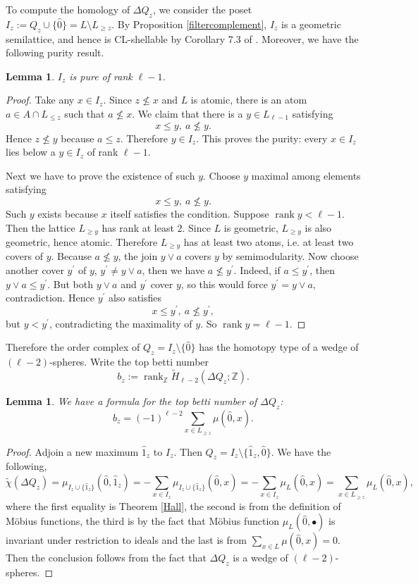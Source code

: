 \documentclass{amsart}
\numberwithin{equation}{section}
\theoremstyle{plain}
\newtheorem{lem}[thm]{Lemma}
\theoremstyle{remark}
\theoremstyle{definition}
\numberwithin{equation}{section}
\newcommand{\Z}{\mathbb{Z}}
\DeclareMathOperator{\rank}{rank}
\begin{document}
To compute the homology of $\Delta Q_z$, we consider the poset $I_z:=Q_z\cup\{\hat{0}\}=L\setminus L_{\geq z}$. By Proposition \ref{filtercomplement}, $I_z$ is a geometric semilattice, and hence is CL-shellable by Corollary 7.3 of \cite{Wachs1986}. Moreover, we have the following purity result.
\begin{lem}
    $I_z$ is pure of rank $\ell-1$.
\end{lem}
\begin{proof}
    Take any $x\in I_z$. Since $z\not\leq x$ and $L$ is atomic, there is an atom $a\in A\cap L_{\leq z}$ such that $a\not\leq x$. We claim that there is a $y\in L_{\ell-1}$ satisfying
    \[
    x\leq y,~a\not\leq y.
    \]
    Hence $z\not\leq y$ because $a\leq z$. Therefore $y\in I_z$. This proves the purity: every $x\in I_z$ lies below a $y\in I_z$ of rank $\ell-1$.

    Next we have to prove the existence of such $y$. Choose $y$ maximal among elements satisfying
    \[
    x\leq y, ~a\not\leq y.
    \]
    Such $y$ exists because $x$ itself satisfies the condition. Suppose $\rank y<\ell-1$. Then the lattice $L_{\geq y}$ has rank at least $2$. Since $L$ is geometric, $L_{\geq y}$ is also geometric, hence atomic. Therefore $L_{\geq y}$ has at least two atoms, i.e. at least two covers of $y$. Because $a\not\leq y$, the join $y\vee a$ covers $y$ by semimodularity. Now choose another cover $y^\prime$ of $y$, $y^\prime\neq y\vee a$, then we have $a\not\leq y^\prime$. Indeed, if $a\leq y^\prime$, then $y\vee a\leq y^\prime$. But both $y\vee a$ and $y^\prime$ cover $y$, so this would force $y^\prime=y\vee a$, contradiction. Hence $y^\prime$ also satisfies
    \[
    x\leq y^\prime,~a\not\leq y^\prime,
    \]
    but $y<y^\prime$, contradicting the maximality of $y$. So $\rank y=\ell-1$.
\end{proof}

Therefore the order complex of $Q_z=I_z\setminus\{\hat{0}\}$ has the homotopy type of a wedge of $(\ell-2)$-spheres. Write the top betti number
\[
b_z:=\rank_{\Z}\widetilde{H}_{\ell-2}(\Delta Q_z;\Z).
\]

\begin{lem}
    We have a formula for the top betti number of $\Delta Q_z$:
    \[
    b_z=(-1)^{\ell-2}\sum_{x\in L_{\geq z}}\mu(\hat{0},x).
    \]
\end{lem}
\begin{proof}
    Adjoin a new maximum $\hat{1}_z$ to $I_z$. Then $Q_z=I_z\setminus\{\hat 1_z,\hat0\}$. We have the following,
    \[
    \widetilde{\chi}(\Delta Q_z)=\mu_{I_z\cup\{\hat{1}_z\}}(\hat{0},\hat{1}_z)=-\sum_{x\in I_z}\mu_{I_z\cup\{\hat{1}_z\}}(\hat{0},x)=-\sum_{x\in I_z}\mu_L(\hat{0},x)=\sum_{x\in L_{\geq z}}\mu_L(\hat{0},x),
    \]
    where the first equality is Theorem \ref{Hall}, the second is from the definition of M\"obius functions, the third is by the fact that M\"obius function $\mu_L(\hat0,\bullet)$ is invariant under restriction to ideals and the last is from $\sum_{x\in L}\mu(\hat0 ,x)=0$. Then the conclusion follows from the fact that $\Delta Q_z$ is a wedge of $(\ell-2)$-spheres.
\end{proof}
\end{document}
